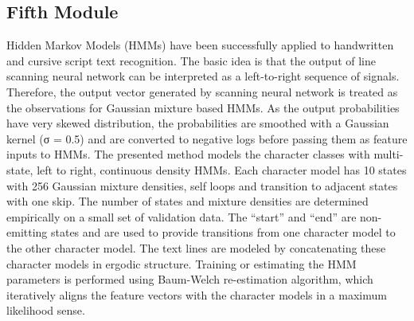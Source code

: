 \subsection{Fifth Module}
Hidden Markov Models (HMMs) have been successfully applied to handwritten and cursive script text recognition. The basic idea is that the output of line scanning neural network can be interpreted as a left-to-right sequence of signals. Therefore, the output vector generated by scanning neural network is treated as the observations for Gaussian mixture based HMMs. As the output probabilities have very skewed distribution, the probabilities are smoothed with a Gaussian kernel (σ = 0.5) and are converted to negative logs before passing them as feature inputs to HMMs. The presented method models the character classes with multi-state, left to right, continuous density HMMs. Each character model has 10 states with 256 Gaussian mixture densities, self loops and transition to adjacent states with one skip. The number of states and mixture densities are determined empirically on a small set of validation data. The “start” and “end” are non-emitting states and are used to provide transitions from one character model to the other character model. The text lines are modeled by concatenating these character models in ergodic structure. Training or estimating the HMM parameters is performed using Baum-Welch re-estimation algorithm, which iteratively aligns the feature vectors with the character models in a maximum likelihood sense.\\
